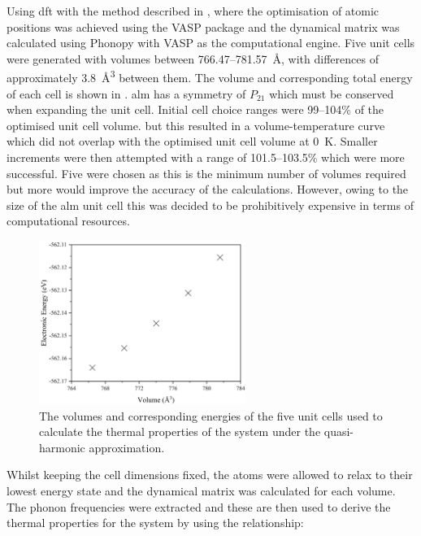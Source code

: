 Using \acrshort{dft} with the method described in , where the optimisation of atomic positions was achieved using the VASP package and the dynamical matrix was calculated using Phonopy with VASP as the computational engine. Five unit cells were generated with volumes between 766.47\nobreakdash--\SI{781.57}{\angstrom}, with differences of approximately \SI{3.8}{\angstrom^3} between them.  The volume and corresponding total energy of each cell is shown in . \acrshort{alm} has a symmetry of \(P_{21}\) which must be conserved when expanding the unit cell. Initial cell choice ranges were 99\nobreakdash--104\% of the optimised unit cell volume. but this resulted in a volume\nobreakdash-temperature curve which did not overlap with the optimised unit cell volume at \SI{0}{K}. Smaller increments were then attempted with a range of 101.5\nobreakdash--103.5\% which were more successful. Five were chosen as this is the minimum number of volumes required but more would improve the accuracy of the calculations. However, owing to the size of the \acrshort{alm} unit cell this was decided to be prohibitively expensive in terms of computational resources.

\begin{figure}[h]
\centering
\includegraphics[width=0.6\textwidth]{Figures/Misc/QHA/evG.png}
\captionsetup{font = footnotesize, justification = centering}
\caption[The Selected Volumes and Corresponding Energies used for the Quasi-Harmonic Approximation]{The volumes and corresponding energies of the five unit cells used to calculate the thermal properties of the system under the quasi-harmonic approximation.}
\label{fig:ev}
\end{figure}

Whilst keeping the cell dimensions fixed, the atoms were allowed to relax to their lowest energy state and the dynamical matrix was calculated for each volume. The phonon frequencies were extracted and these are then used to derive the thermal properties for the system by using the relationship:

